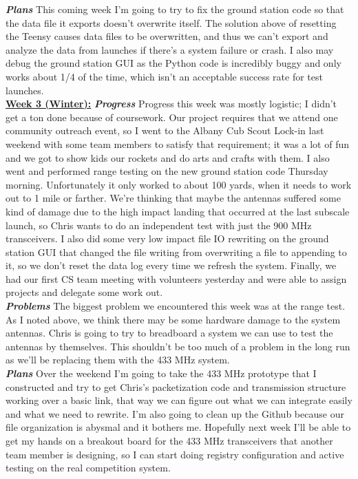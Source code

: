 \documentclass[onecolumn, draftclsnofoot, 10pt, compsoc]{IEEEtran}
\begin{document}
\textbf{\textit{{Plans}}}
\newline This coming week I'm going to try to fix the ground station code so that the data file it exports doesn't overwrite itself. The solution above of resetting the Teensy causes data files to be overwritten, and thus we can't export and analyze the data from launches if there's a system failure or crash. I also may debug the ground station GUI as the Python code is incredibly buggy and only works about 1/4 of the time, which isn't an acceptable success rate for test launches. \\

\underline{\textbf{Week 3 (Winter):}}
\newline\textbf{\textit{{Progress}}}
\newline Progress this week was mostly logistic; I didn't get a ton done because of coursework. Our project requires that we attend one community outreach event, so I went to the Albany Cub Scout Lock-in last weekend with some team members to satisfy that requirement; it was a lot of fun and we got to show kids our rockets and do arts and crafts with them. I also went and performed range testing on the new ground station code Thursday morning. Unfortunately it only worked to about 100 yards, when it needs to work out to 1 mile or farther. We're thinking that maybe the antennas suffered some kind of damage due to the high impact landing that occurred at the last subscale launch, so Chris wants to do an independent test with just the 900 MHz transceivers. I also did some very low impact file IO rewriting on the ground station GUI that changed the file writing from overwriting a file to appending to it, so we don't reset the data log every time we refresh the system. Finally, we had our first CS team meeting with volunteers yesterday and were able to assign projects and delegate some work out. \\

\textbf{\textit{{Problems}}}
\newline The biggest problem we encountered this week was at the range test. As I noted above, we think there may be some hardware damage to the system antennas. Chris is going to try to breadboard a system we can use to test the antennas by themselves. This shouldn't be too much of a problem in the long run as we'll be replacing them with the 433 MHz system. \\

\textbf{\textit{{Plans}}}
\newline Over the weekend I'm going to take the 433 MHz prototype that I constructed and try to get Chris's packetization code and transmission structure working over a basic link, that way we can figure out what we can integrate easily and what we need to rewrite. I'm also going to clean up the Github because our file organization is abysmal and it bothers me. Hopefully next week I'll be able to get my hands on a breakout board for the 433 MHz transceivers that another team member is designing, so I can start doing registry configuration and active testing on the real competition system. \\
\end{document}
